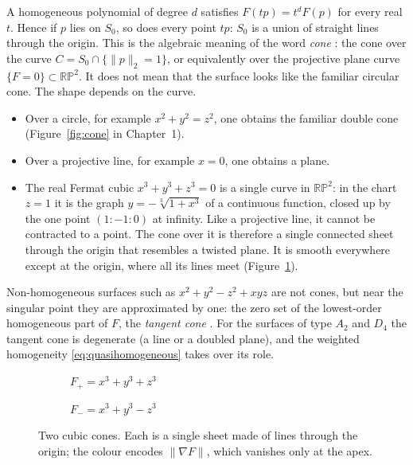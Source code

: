 A homogeneous polynomial of degree $d$ satisfies $F(tp)=t^dF(p)$ for every
real $t$. Hence if $p$ lies on $S_0$, so does every point $tp$: $S_0$ is a
union of straight lines through the origin. This is the algebraic meaning of
the word \emph{cone} \cite{dimca1992singularities}: the cone over the curve
$C=S_0\cap\{\|p\|_2=1\}$, or equivalently over the projective plane curve
$\{F=0\}\subset\mathbb{RP}^2$. It does not mean that the surface looks like
the familiar circular cone. The shape depends on the curve.
\begin{itemize}
    \item Over a circle, for example $x^2+y^2=z^2$, one obtains the familiar
          double cone (Figure~\ref{fig:cone} in Chapter~1).
    \item Over a projective line, for example $x=0$, one obtains a plane.
    \item The real Fermat cubic $x^3+y^3+z^3=0$ is a single curve in
          $\mathbb{RP}^2$: in the chart $z=1$ it is the graph
          $y=-\sqrt[3]{1+x^3}$ of a continuous function, closed up by the one
          point $(1:-1:0)$ at infinity. Like a projective line, it cannot be
          contracted to a point. The cone over it is therefore a single
          connected sheet through the origin that resembles a twisted plane.
          It is smooth everywhere except at the origin, where all its lines
          meet (Figure~\ref{fig:reference-cones}).
\end{itemize}
Non-homogeneous surfaces such as $x^2+y^2-z^2+xyz$ are not cones, but near
the singular point they are approximated by one: the zero set of the
lowest-order homogeneous part of $F$, the \emph{tangent cone}
\cite{dimca1992singularities}. For the surfaces of type $A_2$ and $D_4$ the
tangent cone is degenerate (a line or a doubled plane), and the weighted
homogeneity \eqref{eq:quasihomogeneous} takes over its role.

\begin{figure}[!h]
    \centering
    \begin{subfigure}{0.47\textwidth}
        \centering
        \caption{$F_+=x^3+y^3+z^3$}
    \end{subfigure}
    \hfill
    \begin{subfigure}{0.47\textwidth}
        \centering
        \caption{$F_-=x^3+y^3-z^3$}
    \end{subfigure}
    \caption[Cubic cones]{Two cubic cones. Each is a single sheet made of
    lines through the origin; the colour encodes $\|\nabla F\|$, which
    vanishes only at the apex.}
    \label{fig:reference-cones}
\end{figure}

